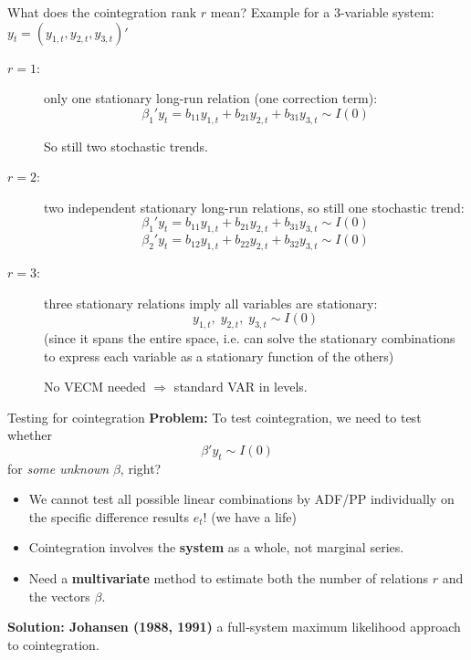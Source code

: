 \documentclass{beamer}
\begin{document}
\begin{frame}{What does the cointegration rank $r$ mean?}
\small
Example for a 3-variable system: $y_t = (y_{1,t}, y_{2,t}, y_{3,t})'$

\begin{description}
  \item[$r = 1$:] only one stationary long-run relation (one correction term):
        \[
          \beta_1' y_t = b_{11} y_{1,t} + b_{21} y_{2,t} + b_{31} y_{3,t} \sim I(0)
        \]

So still two stochastic trends. 
  \item[$r = 2$:] two independent stationary long-run relations, so still one stochastic trend:
        \[
        \beta_1' y_t =
          b_{11} y_{1,t} + b_{21} y_{2,t} + b_{31} y_{3,t} \sim I(0)
        \]
        \[
        \beta_2' y_t =
          b_{12} y_{1,t} + b_{22} y_{2,t} + b_{32} y_{3,t} \sim I(0)
        \]
  \item[$r = 3$:] three stationary relations imply all variables are stationary:
        \[
        y_{1,t},\; y_{2,t},\; y_{3,t} \sim I(0)
        \] 
\footnotesize{(since it spans the entire space, i.e. can solve the stationary combinations to express each variable as a stationary function of the others)}

\smallskip
No VECM needed $\Rightarrow$ standard VAR in levels.
\end{description}

\end{frame}



\begin{frame}{Testing for cointegration}
\small
\textbf{Problem:} To test cointegration, we need to test whether
\[
\beta' y_t \sim I(0)
\]
for \emph{some unknown} $\beta$, right?

\medskip
\begin{itemize}
  \item We cannot test all possible linear combinations by ADF/PP individually on the specific difference results $e_t$! (we have a life)
  \item Cointegration involves the \textbf{system} as a whole, not marginal series.
  \item Need a \textbf{multivariate} method to estimate both 
        the number of relations $r$ and the vectors $\beta$.
\end{itemize}

\medskip
\textbf{Solution: Johansen (1988, 1991)} a full‐system maximum likelihood approach to cointegration.
\end{frame}
\end{document}
